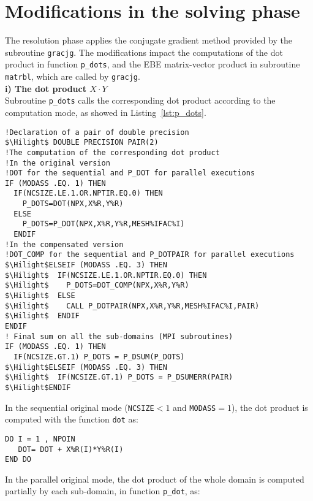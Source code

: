 \section{Modifications in the solving phase}
\label{sec:imple_solve}
%
The resolution phase applies the conjugate gradient method
provided by the subroutine \texttt{gracjg}.
The modifications impact the computations of the dot product
in function \texttt{p\_dots}, and the EBE
matrix-vector product in subroutine \texttt{matrbl},
which are called by \texttt{gracjg}.\\
%
\textbf{i) The dot product $X \cdot Y$}\\
Subroutine \texttt{p\_dots} calls the corresponding dot product according to the computation mode,
as showed in Listing~\ref{lst:p_dots}.
%
\begin{lstlisting}[language=TelFortran, caption={The calls of the corresponding dot product in \texttt{p\_dots}},label={lst:p_dots},escapechar=\$]
!Declaration of a pair of double precision
$\Hilight$ DOUBLE PRECISION PAIR(2)
!The computation of the corresponding dot product
!In the original version
!DOT for the sequential and P_DOT for parallel executions
IF (MODASS .EQ. 1) THEN
  IF(NCSIZE.LE.1.OR.NPTIR.EQ.0) THEN
    P_DOTS=DOT(NPX,X%R,Y%R)
  ELSE
    P_DOTS=P_DOT(NPX,X%R,Y%R,MESH%IFAC%I)
  ENDIF
!In the compensated version
!DOT_COMP for the sequential and P_DOTPAIR for parallel executions
$\Hilight$ELSEIF (MODASS .EQ. 3) THEN
$\Hilight$  IF(NCSIZE.LE.1.OR.NPTIR.EQ.0) THEN
$\Hilight$    P_DOTS=DOT_COMP(NPX,X%R,Y%R)
$\Hilight$  ELSE
$\Hilight$    CALL P_DOTPAIR(NPX,X%R,Y%R,MESH%IFAC%I,PAIR)
$\Hilight$  ENDIF
ENDIF
! Final sum on all the sub-domains (MPI subroutines)
IF (MODASS .EQ. 1) THEN
  IF(NCSIZE.GT.1) P_DOTS = P_DSUM(P_DOTS)
$\Hilight$ELSEIF (MODASS .EQ. 3) THEN
$\Hilight$  IF(NCSIZE.GT.1) P_DOTS = P_DSUMERR(PAIR)
$\Hilight$ENDIF
\end{lstlisting}
%
In the sequential original mode (\texttt{NCSIZE}$<1$ and \texttt{MODASS}$=1$),
the dot product is computed with the function \texttt{dot} as:
\begin{lstlisting}[language=TelFortran,numbers=none,frame=none,escapechar=\$]
DO I = 1 , NPOIN
   DOT= DOT + X%R(I)*Y%R(I)
END DO
\end{lstlisting}
%
In the parallel original mode, the dot product of the whole domain
is computed partially by each sub-domain, in function \texttt{p\_dot}, as:

